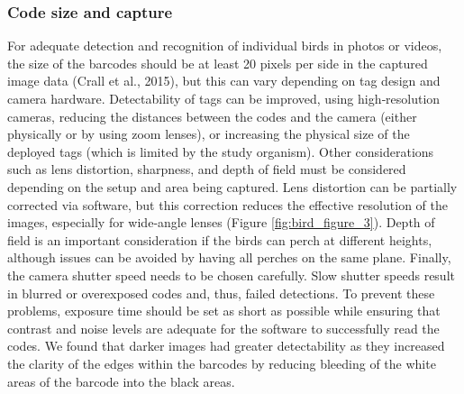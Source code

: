 \documentclass[11pt,a4paper,oneside]{book}
\begin{document}
\begin{doublespace}
\subsubsection{Code size and capture}
For adequate detection and recognition of individual birds in photos or videos, the size of the barcodes should be at least 20 pixels per side in the captured image data (Crall et al., 2015), but this can vary depending on tag design and camera hardware. Detectability of tags can be improved, using high‐resolution cameras, reducing the distances between the codes and the camera (either physically or by using zoom lenses), or increasing the physical size of the deployed tags (which is limited by the study organism). Other considerations such as lens distortion, sharpness, and depth of field must be considered depending on the setup and area being captured. Lens distortion can be partially corrected via software, but this correction reduces the effective resolution of the images, especially for wide‐angle lenses (Figure \ref{fig:bird_figure_3}). Depth of field is an important consideration if the birds can perch at different heights, although issues can be avoided by having all perches on the same plane. Finally, the camera shutter speed needs to be chosen carefully. Slow shutter speeds result in blurred or overexposed codes and, thus, failed detections. To prevent these problems, exposure time should be set as short as possible while ensuring that contrast and noise levels are adequate for the software to successfully read the codes. We found that darker images had greater detectability as they increased the clarity of the edges within the barcodes by reducing bleeding of the white areas of the barcode into the black areas.


\end{doublespace}
\end{document}
